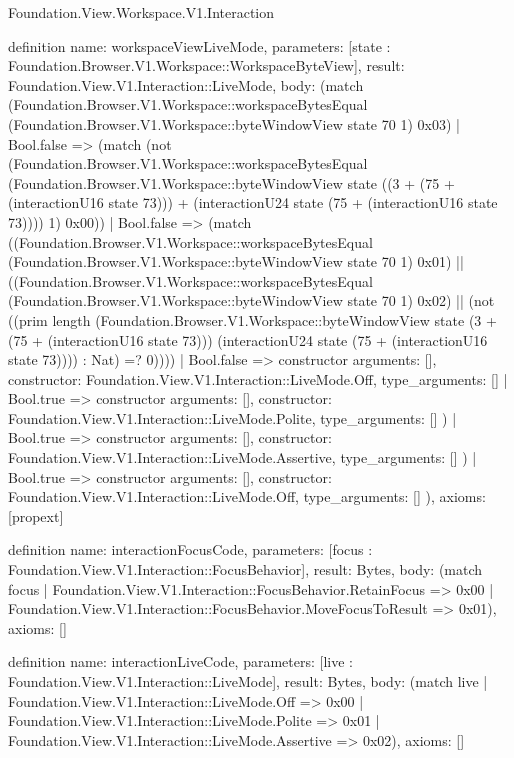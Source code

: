 \begin{lexlean}{Foundation.View.Workspace.V1.Interaction}
\begin{semanticmodule}
definition{
  name: workspaceViewLiveMode,
  parameters: [state : Foundation.Browser.V1.Workspace::WorkspaceByteView],
  result: Foundation.View.V1.Interaction::LiveMode,
  body: (match (Foundation.Browser.V1.Workspace::workspaceBytesEqual (Foundation.Browser.V1.Workspace::byteWindowView state 70 1) 0x03)
    | Bool.false => (match (not (Foundation.Browser.V1.Workspace::workspaceBytesEqual (Foundation.Browser.V1.Workspace::byteWindowView state ((3 + (75 + (interactionU16 state 73))) + (interactionU24 state (75 + (interactionU16 state 73)))) 1) 0x00))
      | Bool.false => (match ((Foundation.Browser.V1.Workspace::workspaceBytesEqual (Foundation.Browser.V1.Workspace::byteWindowView state 70 1) 0x01) || ((Foundation.Browser.V1.Workspace::workspaceBytesEqual (Foundation.Browser.V1.Workspace::byteWindowView state 70 1) 0x02) || (not ((prim length (Foundation.Browser.V1.Workspace::byteWindowView state (3 + (75 + (interactionU16 state 73))) (interactionU24 state (75 + (interactionU16 state 73)))) : Nat) =? 0))))
        | Bool.false => constructor{
          arguments: [],
          constructor: Foundation.View.V1.Interaction::LiveMode.Off,
          type_arguments: []
        }
        | Bool.true => constructor{
          arguments: [],
          constructor: Foundation.View.V1.Interaction::LiveMode.Polite,
          type_arguments: []
        })
      | Bool.true => constructor{
        arguments: [],
        constructor: Foundation.View.V1.Interaction::LiveMode.Assertive,
        type_arguments: []
      })
    | Bool.true => constructor{
      arguments: [],
      constructor: Foundation.View.V1.Interaction::LiveMode.Off,
      type_arguments: []
    }),
  axioms: [propext]
}

definition{
  name: interactionFocusCode,
  parameters: [focus : Foundation.View.V1.Interaction::FocusBehavior],
  result: Bytes,
  body: (match focus
    | Foundation.View.V1.Interaction::FocusBehavior.RetainFocus => 0x00
    | Foundation.View.V1.Interaction::FocusBehavior.MoveFocusToResult => 0x01),
  axioms: []
}

definition{
  name: interactionLiveCode,
  parameters: [live : Foundation.View.V1.Interaction::LiveMode],
  result: Bytes,
  body: (match live
    | Foundation.View.V1.Interaction::LiveMode.Off => 0x00
    | Foundation.View.V1.Interaction::LiveMode.Polite => 0x01
    | Foundation.View.V1.Interaction::LiveMode.Assertive => 0x02),
  axioms: []
}


\end{semanticmodule}
\end{lexlean}
